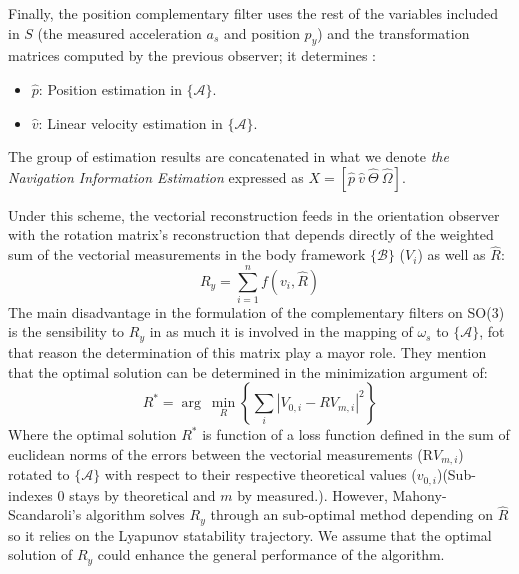\documentclass[10pt,conference]{IEEEtran}
\newcommand{\marco}[1]{\{\mathcal{#1}\}}
\begin{document}
Finally, the position complementary filter uses the rest of the variables included in $S$ (the measured acceleration $a_s$ and position $p_y$) and the transformation matrices computed by the previous observer; it determines :
\begin{itemize}
\item $\hat{p}$: Position estimation in $\marco{A}$.
\item $\hat{v}$: Linear velocity estimation in $\marco{A}$.
\end{itemize}
The group of estimation results are concatenated in what we denote \emph{the Navigation Information Estimation } expressed as $X=[\hat{p}~\hat{v}~\hat{\Theta}~\hat{\Omega}]$.\par
Under this scheme, the vectorial reconstruction feeds in the orientation observer with the rotation matrix's reconstruction that depends directly of the weighted sum of the vectorial measurements in the body framework $\marco{B}$ ($V_i$) as well as $\hat{R}$: 
\begin{equation}\label{ReconstruccionVectorial}
R_y=\sum_{i=1}^{n}f(v_i,\hat{R})
\end{equation}
The main disadvantage in the formulation of the complementary filters on SO(3) is the sensibility  to $R_y$ in as much it is involved in the mapping of $\omega_s$ to $\marco{A}$, fot that reason the determination of this matrix play a mayor role. They mention that the optimal solution can be determined in the minimization argument of:
\begin{equation}\label{ProblemaOptimizacion}
R^*=\arg~\min_{R}\left\{\sum_i|V_{0,i}-RV_{m,i}|^2\right\}
\end{equation}
Where the optimal solution  $R^*$ is function of a loss function defined in the sum of euclidean norms of the errors between the vectorial measurements   (R$V_{m,i}$) rotated to $\marco{A}$ with respect to their respective theoretical values ($v_{0,i}$)(Sub-indexes $0$ stays by theoretical and $m$ by measured.). However, Mahony-Scandaroli's algorithm solves $R_y$ through an sub-optimal method depending on $\hat{R}$ so it relies on the Lyapunov statability trajectory.  We assume that the optimal solution of $R_y$ could enhance the general performance of the algorithm.
\end{document}
